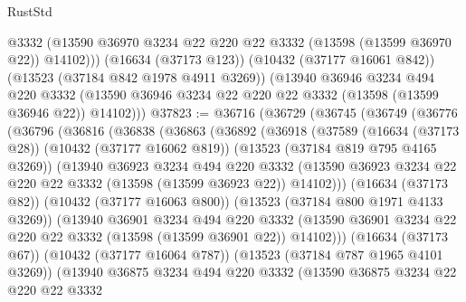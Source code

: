 \begin{lexlean}{RustStd}
\begin{coremodule}
          @3332
          (@13590 @36970 @3234 @22 @220 @22 @3332 (@13598 (@13599 @36970 @22)) @14102)))
      (@16634 (@37173 @123))
      (@10432 (@37177 @16061 @842))
      (@13523 (@37184 @842 @1978 @4911 @3269))
      (@13940
        @36946
        @3234
        @494
        @220
        @3332
        (@13590 @36946 @3234 @22 @220 @22 @3332 (@13598 (@13599 @36946 @22)) @14102)))
@37823 := @36716
    (@36729
      (@36745
        (@36749
          (@36776
            (@36796
              (@36816
                (@36838
                  (@36863
                    (@36892
                      (@36918
                        (@37589
                          (@16634 (@37173 @28))
                          (@10432 (@37177 @16062 @819))
                          (@13523 (@37184 @819 @795 @4165 @3269))
                          (@13940
                            @36923
                            @3234
                            @494
                            @220
                            @3332
                            (@13590
                              @36923
                              @3234
                              @22
                              @220
                              @22
                              @3332
                              (@13598 (@13599 @36923 @22))
                              @14102)))
                        (@16634 (@37173 @82))
                        (@10432 (@37177 @16063 @800))
                        (@13523 (@37184 @800 @1971 @4133 @3269))
                        (@13940
                          @36901
                          @3234
                          @494
                          @220
                          @3332
                          (@13590
                            @36901
                            @3234
                            @22
                            @220
                            @22
                            @3332
                            (@13598 (@13599 @36901 @22))
                            @14102)))
                      (@16634 (@37173 @67))
                      (@10432 (@37177 @16064 @787))
                      (@13523 (@37184 @787 @1965 @4101 @3269))
                      (@13940
                        @36875
                        @3234
                        @494
                        @220
                        @3332
                        (@13590
                          @36875
                          @3234
                          @22
                          @220
                          @22
                          @3332

\end{coremodule}
\end{lexlean}
